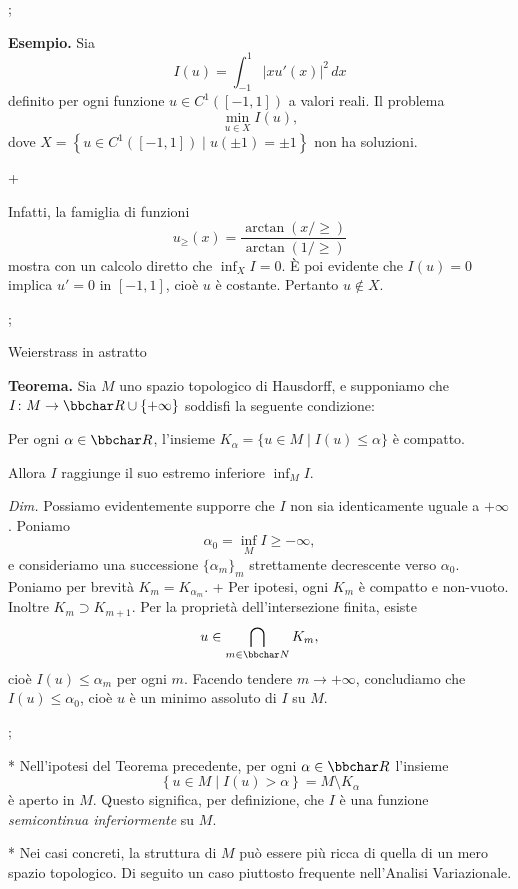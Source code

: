 \pg;

{\bf Esempio.} Sia
$$
I(u) = \int_{-1}^1 \left| x u'(x) \right|^2 \, dx
$$
definito per ogni funzione $u \in C^1([-1,1])$ a valori reali. Il
problema
$$
\min_{u \in X} I(u),
$$
dove $X = \left\{ u \in C^1([-1,1]) \mid u(\pm 1) = \pm 1 \right\}$
non ha soluzioni.

\pg+

Infatti, la famiglia di funzioni
$$
u_\ge (x) = \frac{\arctan(x/\ge)}{\arctan(1/\ge)}
$$
mostra con un calcolo diretto che $\inf_X I=0$. \`E poi evidente che
$I(u)=0$ implica $u'=0$ in $[-1,1]$, cio\`e $u$ \`e costante. Pertanto
$u \notin X$.

\pg;

\sec Weierstrass in astratto

{\bf Teorema.} Sia $M$ uno spazio topologico di Hausdorff, e
supponiamo che $I \colon M \to \R \cup \{+\infty\}$ soddisfi la
seguente condizione:

\smallskip

Per ogni $\alpha \in \R$, l'insieme $K_\alpha = \{ u \in M \mid I(u)
\leq \alpha \}$ \`e compatto.

\smallskip

Allora $I$ raggiunge il suo estremo inferiore $\inf_M I$.

\medskip

{\em Dim.} Possiamo evidentemente supporre che $I$ non sia
identicamente uguale a $+\infty$. Poniamo
$$
\alpha_0 = \inf_M I \geq -\infty,
$$
e consideriamo una successione $\{\alpha_m\}_m$ strettamente
decrescente verso $\alpha_0$. Poniamo per brevit\`a
$K_m=K_{\alpha_m}$.
\pg+
Per ipotesi, ogni $K_m$ \`e compatto e non-vuoto. Inoltre $K_m \supset
K_{m+1}$. Per la propriet\`a dell'intersezione finita, esiste
$$
u \in \bigcap_{m \in {\bbchar N}} K_m,
$$
cio\`e $I(u) \leq \alpha_m$ per ogni $m$. Facendo tendere $m \to
+\infty$, concludiamo che $I(u) \leq \alpha_0$, cio\`e $u$ \`e un
minimo assoluto di $I$ su $M$.

\pg;

* Nell'ipotesi del Teorema precedente, per ogni $\alpha \in \R$
  l'insieme
  $$
  \left\{ u \in M \mid I(u) > \alpha \right\} = M \setminus K_\alpha
  $$
  \`e aperto in $M$. Questo significa, per definizione, che $I$ \`e
  una funzione {\em semicontinua inferiormente} su $M$.

* Nei casi concreti, la struttura di $M$ pu\`o essere pi\`u ricca di
  quella di un mero spazio topologico. Di seguito un caso piuttosto
  frequente nell'Analisi Variazionale.

